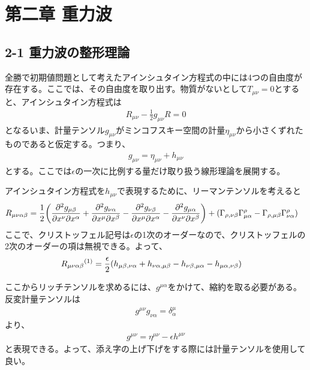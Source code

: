 \documentclass[autodetect-engine,dvi=dvipdfmx,ja=standard, 10pt, a4paper]{bxjsarticle}
\begin{document}
\section*{第二章 重力波}
\subsection*{2-1 重力波の整形理論}
全勝で初期値問題として考えたアインシュタイン方程式の中には4つの自由度が存在する。ここでは、その自由度を取り出す。物質がないとして$T_{\mu\nu}=0$とすると、アインシュタイン方程式は
\begin{align}
	R_{\mu\nu} - \frac{1}{2}g_{\mu\nu}R = 0
	\label{eq:einstein_equation}
\end{align}
となるいま、計量テンソル$g_{\mu\nu}$がミンコフスキー空間の計量$\eta_{\mu\nu}$から小さくずれたものであると仮定する。つまり、
\begin{align}
	g_{\mu\nu} = \eta_{\mu\nu} + h_{\mu\nu}
\end{align}
とする。ここでは$\epsilon$の一次に比例する量だけ取り扱う線形理論を展開する。

アインシュタイン方程式を$h_{\mu\nu}$で表現するために、リーマンテンソルを考えると
\begin{align}
	R_{\mu\nu\alpha\beta} &= \frac{1}{2}\qty(\pdv{^2 g_{\mu\beta}}{x^\nu \partial x^\alpha} + \pdv{^2 g_{\nu\alpha}}{x^\mu \partial x^\beta}  - \pdv{^2 g_{\nu\beta}}{x^\mu \partial x^\alpha}- \pdv{^2 g_{\mu\alpha}}{x^\nu \partial x^\beta}) + (\Gamma_{\rho,\nu\beta}\Gamma^\rho_{\mu\alpha} - \Gamma_{\rho,\mu\beta}\Gamma^\rho_{\nu\alpha})
\end{align}
ここで、クリストッフェル記号は$\epsilon$の1次のオーダーなので、クリストッフェルの2次のオーダーの項は無視できる。よって、
\begin{align}
	R_{\mu\nu\alpha\beta} {}^{(1)}&= \frac{\epsilon}{2}\qty(h_{\mu\beta,\nu\alpha} + h_{\nu\alpha,\mu\beta} - h_{\nu\beta,\mu\alpha}- h_{\mu\alpha,\nu\beta})
\end{align}

ここからリッチテンソルを求めるには、$g^{\mu\alpha}$をかけて、縮約を取る必要がある。反変計量テンソルは
\begin{align}
	g^{\mu\nu} g_{\nu\alpha} = \delta^\mu_\alpha
\end{align}
より、
\begin{align}
	g^{\mu\nu} = \eta^{\mu\nu} - \epsilon h^{\mu\nu}
\end{align}
と表現できる。よって、添え字の上げ下げをする際には計量テンソルを使用して良い。
\end{document}
